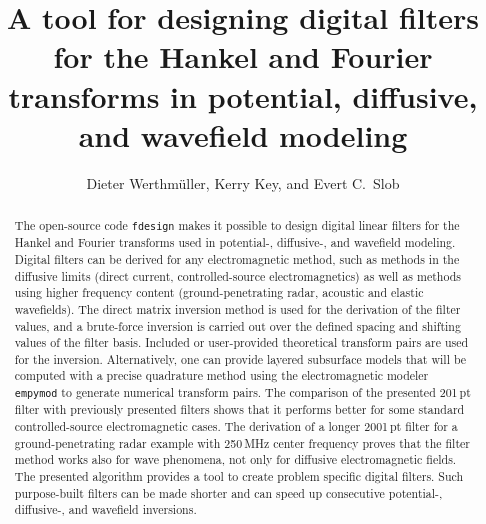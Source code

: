 \documentclass[paper,twocolumn,twoside]{geophysics}
\begin{document}
\title{A tool for designing digital filters for the Hankel and Fourier
transforms in potential, diffusive, and wavefield modeling}

\renewcommand{\thefootnote}{\fnsymbol{footnote}}


\address{
\footnotemark[1]TU Delft,
Building 23,
Stevinweg 1 / PO-box 5048,
2628 CN Delft,
E-mail: \href{mailto:D.Werthmuller@tudelft.nl}{D.Werthmuller@tudelft.nl};
\href{mailto:E.C.Slob@tudelft.nl}{E.C.Slob@tudelft.nl};
\footnotemark[2]Instituto Mexicano del Petróleo,
Eje Central Lázaro Cárdenas Norte 152,
Col. San Bartolo Atepehuacan C.P. 07730,
Ciudad de México, México,
\footnotemark[3]Lamont-Doherty Earth Observatory, Columbia University,
305C Oceanography,
61 Route 9W, PO Box 1000,
Palisades NY 10964-8000 US,
E-mail: \href{mailto:KKey@ldeo.columbia.edu}{KKey@ldeo.columbia.edu}.
}


\author{%
Dieter Werthmüller\footnotemark[1]\footnotemark[2], %
Kerry Key\footnotemark[3], and %
Evert C.\ Slob\footnotemark[1]%
}

\footer{}

\maketitle

\begin{abstract} %
%
  The open-source code \texttt{fdesign} makes it possible to design digital
  linear filters for the Hankel and Fourier transforms used in potential-,
  diffusive-, and wavefield modeling. Digital filters can be derived for any
  electromagnetic method, such as methods in the diffusive limits (direct
  current, controlled-source electromagnetics) as well as methods using higher
  frequency content (ground-penetrating radar, acoustic and elastic wavefields).
%
  The direct matrix inversion method is used for the derivation of the filter
  values, and a brute-force inversion is carried out over the defined spacing
  and shifting values of the filter basis. Included or user-provided
  theoretical transform pairs are used for the inversion. Alternatively, one
  can provide layered subsurface models that will be computed with a precise
  quadrature method using the electromagnetic modeler \texttt{empymod} to
  generate numerical transform pairs.
%
  The comparison of the presented 201\,pt filter with previously presented
  filters shows that it performs better for some standard controlled-source
  electromagnetic cases. The derivation of a longer 2001\,pt filter for a
  ground-penetrating radar example with 250\,MHz center frequency proves that
  the filter method works also for wave phenomena, not only for diffusive
  electromagnetic fields.
%
  The presented algorithm provides a tool to create problem specific digital
  filters. Such purpose-built filters can be made shorter and can speed up
  consecutive  potential-, diffusive-, and wavefield inversions.
%
\end{abstract}
\end{document}
